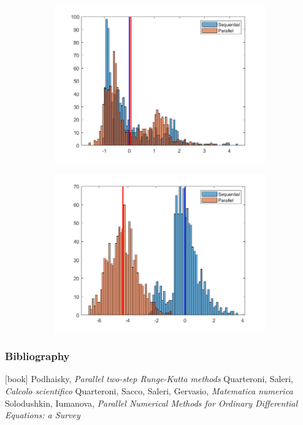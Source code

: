 \documentclass{beamer}
\begin{document}
\begin{frame}
\begin{figure}
\begin{subfigure}{.333\textwidth}
			\includegraphics[width=\linewidth]{etc/test5_3.jpeg}
		\end{subfigure}%
		\begin{subfigure}{.333\textwidth}
			\includegraphics[width=\linewidth]{etc/test6_3.jpeg}
		\end{subfigure}
	\end{figure}
\end{frame}



\begin{frame} %
	\frametitle{Bibliography}
	\begin{thebibliography}{9}
		 Podhaisky, \textit{Parallel two-step Runge-Kutta methods}
		 Quarteroni, Saleri, \textit{Calcolo scientifico}
		 Quarteroni, Sacco, Saleri, Gervasio, \textit{Matematica numerica}
		 Solodushkin, Iumanova, \textit{Parallel Numerical Methods for Ordinary Differential Equations: a Survey}	
	\end{thebibliography}
\end{frame}
\end{document}
